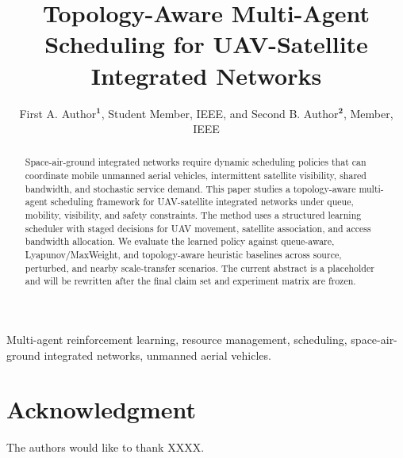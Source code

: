 \documentclass{ieeetmlcn}
\def\authorrefmark#1{\ensuremath{^{\textbf{#1}}}}
\begin{document}


\title{Topology-Aware Multi-Agent Scheduling for UAV-Satellite Integrated Networks}

\author{First A. Author\authorrefmark{1}, Student Member, IEEE, and Second B. Author\authorrefmark{2}, Member, IEEE}

\begin{abstract}
Space-air-ground integrated networks require dynamic scheduling policies that
can coordinate mobile unmanned aerial vehicles, intermittent satellite
visibility, shared bandwidth, and stochastic service demand. This paper studies
a topology-aware multi-agent scheduling framework for UAV-satellite integrated
networks under queue, mobility, visibility, and safety constraints. The method
uses a structured learning scheduler with staged decisions for UAV movement,
satellite association, and access bandwidth allocation. We evaluate the learned
policy against queue-aware, Lyapunov/MaxWeight, and topology-aware heuristic
baselines across source, perturbed, and nearby scale-transfer scenarios. The
current abstract is a placeholder and will be rewritten after the final claim
set and experiment matrix are frozen.
\end{abstract}

\begin{IEEEkeywords}
Multi-agent reinforcement learning, resource management, scheduling,
space-air-ground integrated networks, unmanned aerial vehicles.
\end{IEEEkeywords}

\maketitle








\section*{Acknowledgment}
The authors would like to thank XXXX.



\end{document}
